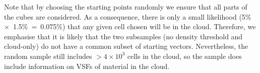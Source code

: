 Note that by choosing the starting points randomly we ensure that all parts of the cubes are considered. 
As a consequence, there is only a small likelihood (5\%~$\times$~1.5\%~=~0.075\%) that
    any given cell chosen will be in the cloud.  
Therefore, we emphasise that it is likely that the two subsamples (no density threshold and cloud-only) do not 
have a common subset of starting vectors.
     Nevertheless, the random sample still includes $>4 \times 10^3$ cells in the cloud, so the  
     sample does include information on VSFs of material in the cloud.        



\endinput
